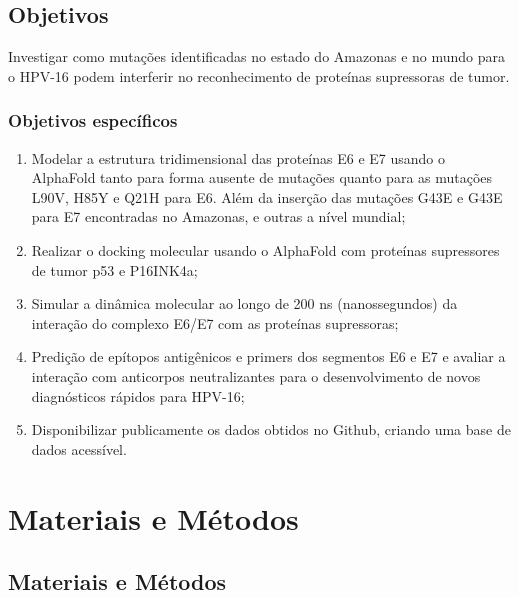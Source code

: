 \chapter{Objetivos}

Investigar como mutações identificadas no estado do Amazonas e no mundo para o HPV-16 podem interferir no reconhecimento de proteínas supressoras de tumor.

\section{Objetivos específicos}

\begin{enumerate}
    \item Modelar a estrutura tridimensional das proteínas E6 e E7 usando o AlphaFold tanto para forma ausente de mutações quanto para as mutações L90V, H85Y e Q21H para E6. Além da inserção das mutações G43E e G43E para E7 encontradas no Amazonas, e outras a nível mundial;

    \item Realizar o docking molecular usando o AlphaFold com proteínas supressores de tumor p53 e P16INK4a;

    \item Simular a dinâmica molecular ao longo de 200 ns (nanossegundos) da interação do complexo E6/E7 com as proteínas supressoras;

    \item Predição de epítopos antigênicos e primers dos segmentos E6 e E7 e avaliar a interação com anticorpos neutralizantes para o desenvolvimento de novos diagnósticos rápidos para HPV-16;

    \item Disponibilizar publicamente os dados obtidos no Github, criando uma base de dados acessível.
\end{enumerate}

\part{Materiais e Métodos}


\chapter{Materiais e Métodos}\label{cap_exemplos}

